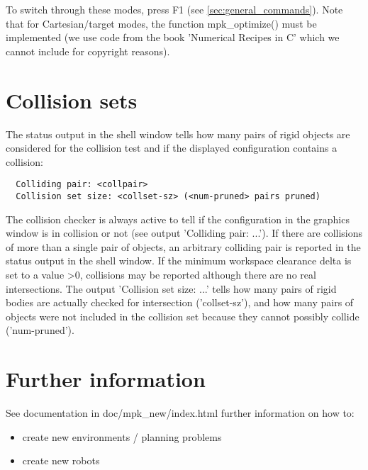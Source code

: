 \documentclass[letter,12pt]{article}
\begin{document}
To switch through these modes, press F1 (see
\ref{sec:general_commands}).  Note that for Cartesian/target modes,
the function mpk_optimize() must be implemented (we use code from the
book 'Numerical Recipes in C' which we cannot include for copyright
reasons).


\section{Collision sets}

The status output in the shell window tells how many pairs of rigid
objects are considered for the collision test and if the displayed
configuration contains a collision:

\begin{verbatim}
  Colliding pair: <collpair>
  Collision set size: <collset-sz> (<num-pruned> pairs pruned)
\end{verbatim}

The collision checker is always active to tell if the configuration in
the graphics window is in collision or not (see output 'Colliding
pair: ...').  If there are collisions of more than a single pair of
objects, an arbitrary colliding pair is reported in the status output
in the shell window.  If the minimum workspace clearance delta is set
to a value >0, collisions may be reported although there are no real
intersections.  The output 'Collision set size: ...' tells how many
pairs of rigid bodies are actually checked for intersection
('collset-sz'), and how many pairs of objects were not included in the
collision set because they cannot possibly collide ('num-pruned').


\section{Further information}

See documentation in doc/mpk_new/index.html further information
on how to:

\begin{itemize}

\item create new environments / planning problems

\item create new robots

\end{itemize}
\end{document}
